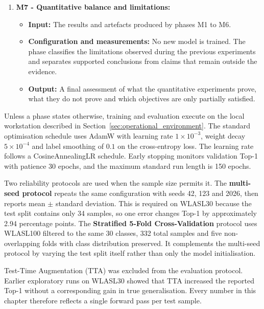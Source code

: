 \begin{enumerate}
    \item \textbf{M7 - Quantitative balance and limitations:}
          \begin{itemize}
              \item \textbf{Input:} The results and artefacts produced by phases M1 to M6.
              \item \textbf{Configuration and measurements:} No new model is trained. The phase
                    classifies the limitations observed during the previous experiments and
                    separates supported conclusions from claims that remain outside the evidence.
              \item \textbf{Output:} A final assessment of what the quantitative experiments prove,
                    what they do not prove and which objectives are only partially satisfied.
          \end{itemize}
\end{enumerate}

Unless a phase states otherwise, training and evaluation execute on the local workstation described
in Section~\ref{sec:operational_environment}. The standard optimisation schedule uses AdamW with
learning rate $1 \times 10^{-3}$, weight decay $5 \times 10^{-4}$ and label smoothing of $0.1$ on
the cross-entropy loss. The learning rate follows a CosineAnnealingLR schedule. Early stopping
monitors validation Top-1 with patience 30 epochs, and the maximum standard run length is 150
epochs.

Two reliability protocols are used when the sample size permits it. The \textbf{multi-seed
protocol} repeats the same configuration with seeds 42, 123 and 2026, then reports mean $\pm$
standard deviation. This is required on WLASL30 because the test split contains only 34 samples, so
one error changes Top-1 by approximately 2.94 percentage points. The \textbf{Stratified 5-Fold
Cross-Validation} protocol uses WLASL100 filtered to the same 30 classes, 332 total samples and
five non-overlapping folds with class distribution preserved. It complements the multi-seed
protocol by varying the test split itself rather than only the model initialisation.

Test-Time Augmentation (TTA) was excluded from the evaluation protocol. Earlier exploratory runs on
WLASL30 showed that TTA increased the reported Top-1 without a corresponding gain in true
generalisation. Every number in this chapter therefore reflects a single forward pass per test
sample.

